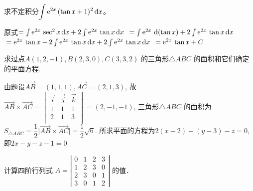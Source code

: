 \documentclass{jnuexam}
\begin{document}
\bigskip

\newpagea %


\newpageb %

\begin{problem}
求不定积分$\displaystyle\int\mathrm{e}^{2x}\,(\tan x+1)^2\mathop{}\!\mathrm{d} x$。
\end{problem}

\bigskip

\begin{solution}
\everymath{\displaystyle}%
原式$=\int\mathrm{e}^{2x}\,\sec^2 x\mathop{}\!\mathrm{d} x+2\int\mathrm{e}^{2x}\,\tan x\mathop{}\!\mathrm{d} x$ 
\hspace{5em}${}=\int\e^{2x}\,\d(\tan x)+ 2\int\e^{2x}\,\tan x\dx$ 
\hspace{5em}${}=\mathrm{e}^{2x}\,\tan x - 2\int\mathrm{e}^{2x}\,\tan x\mathop{}\!\mathrm{d} x+ 2\int\mathrm{e}^{2x}\,\tan x\mathop{}\!\mathrm{d} x$ 
\hspace{5em}${}=\mathrm{e}^{2x}\,\tan x + C$ 
\end{solution}

\vfill

\begin{problem}
求过点$A(1,2,-1), B(2,3,0),C(3,3,2)$ 的三角形$\triangle ABC$ 的面积和它们确定的平面方程.
\end{problem}

\bigskip

\begin{solution}
由题设$\overrightarrow{AB}=(1,1,1),\overrightarrow{AC}=(2,1,3)$, 
故$\overrightarrow{AB}\times \overrightarrow{AC}=\begin{vmatrix}
\vec{i}&\vec{j} &\vec{k}\\
1&1&1\\
2&1&3\\
\end{vmatrix}=(2,-1,-1)$, 
三角形$\triangle ABC$ 的面积为$S_{\triangle ABC}=\dfrac{1}{2}\big|\overrightarrow{AB}\times
\overrightarrow{AC}\big|=\dfrac{1}{2}\sqrt{6}.$ 
所求平面的方程为$2(x-2)-(y-3)-z=0$, 即$2x-y-z-1=0$ 			
\end{solution}

\vfill

\newpage %

\begin{problem}
计算四阶行列式 $A = \left|\begin{array}{cccc}
  0 & 1 & 2 & 3\\
  1 & 2 & 3 & 0\\
  2 & 3 & 0 & 1\\
  3 & 0 & 1 & 2
\end{array}\right|$ 的值．
\end{problem}
\end{document}
